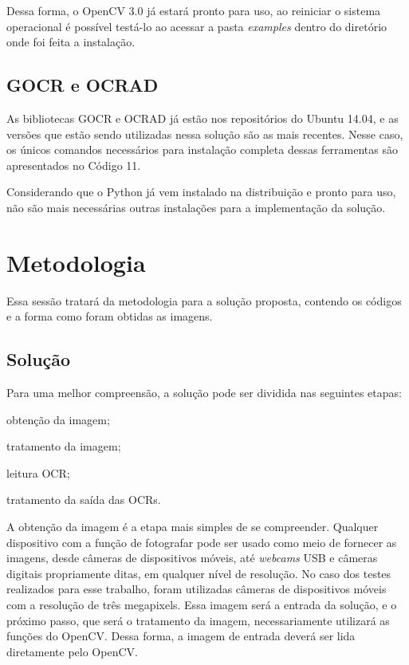Dessa forma, o OpenCV 3.0 já estará pronto para uso, ao reiniciar o sistema operacional é possível testá-lo ao acessar a pasta \textit{examples} dentro do diretório onde foi feita a instalação.

\subsection{GOCR e OCRAD}

As bibliotecas GOCR e OCRAD já estão nos repositórios do Ubuntu 14.04, e as versões que estão sendo utilizadas nessa solução são as mais recentes. Nesse caso, os únicos comandos necessários para instalação completa dessas ferramentas são apresentados no Código 11.



Considerando que o Python já vem instalado na distribuição e pronto para uso, não são mais necessárias outras instalações para a implementação da solução.

\section{Metodologia}

Essa sessão tratará da metodologia para a solução proposta, contendo os códigos e a forma como foram obtidas as imagens. 

\subsection{Solução}

Para uma melhor compreensão, a solução pode ser dividida nas seguintes etapas:

\begin{alineas}
\item obtenção da imagem;
\item tratamento da imagem;
\item leitura OCR;
\item tratamento da saída das OCRs.
\end{alineas}

A obtenção da imagem é a etapa mais simples de se compreender. Qualquer dispositivo com a função de fotografar pode ser usado como meio de fornecer as imagens, desde câmeras de dispositivos móveis, até \textit{webcams} USB e câmeras digitais propriamente ditas, em qualquer nível de resolução. No caso dos testes realizados para esse trabalho, foram utilizadas câmeras de dispositivos móveis com a resolução de três megapixels. Essa imagem será a entrada da solução, e o próximo passo, que será o tratamento da imagem, necessariamente utilizará as funções do OpenCV. Dessa forma, a imagem de entrada deverá ser lida diretamente pelo OpenCV.

